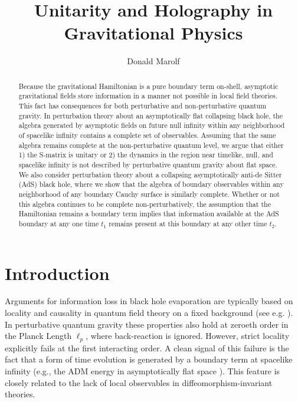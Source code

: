 \documentclass[12pt,onecolumn,eqsecnum,aps,prd,nofootinbib]{revtex4}
\begin{document}
\title{Unitarity and Holography in Gravitational Physics}


\author{Donald Marolf}



\begin{abstract}
Because the gravitational Hamiltonian is a pure boundary
term on-shell, asymptotic gravitational fields store information in
a manner not possible in local field theories. This fact has
consequences for both perturbative and non-perturbative quantum
gravity. In perturbation theory about an asymptotically flat
collapsing black hole, the algebra generated by asymptotic fields on
future null infinity within any neighborhood of spacelike infinity
contains a complete set of observables.   Assuming that the same algebra remains complete at the non-perturbative quantum level, we argue that either 1) the
S-matrix is unitary or 2) the dynamics in the region near timelike,
null, and spacelike infinity is not described by perturbative
quantum gravity about flat space. We also consider perturbation
theory about a collapsing asymptotically anti-de Sitter (AdS) black
hole, where we show that the algebra of boundary observables within
any neighborhood of any boundary Cauchy surface is similarly
complete. Whether or not this algebra continues to be complete
non-perturbatively, the assumption that the Hamiltonian remains a
boundary term implies that information available at the AdS boundary
at any one time $t_1$ remains present at this boundary at any other
time $t_2$.
\end{abstract}




\maketitle

\tableofcontents

\section{Introduction}

Arguments for information loss in black hole evaporation are
typically based on locality and causality in quantum field theory on
a fixed background (see e.g. \cite{Hawking1,Wald}). In perturbative
quantum gravity these properties also hold at zeroeth order in the
Planck Length $\ell_p$, where back-reaction is ignored. However, strict
locality explicitly fails at the first interacting order.  A clean
signal of this failure is the fact that a form of time evolution is generated by a
boundary term at spacelike infinity (e.g., the ADM energy in
asymptotically flat space \cite{ADM}).  This feature is closely related to
the lack of local observables in diffeomorphism-invariant theories.
\end{document}
